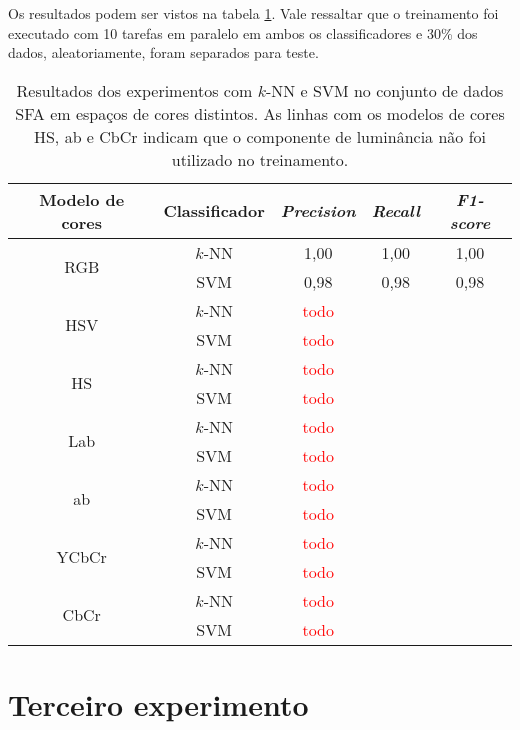 Os resultados podem ser vistos na tabela \ref{tab:resultados_experimento_dois}. Vale ressaltar que o treinamento foi executado com 10 tarefas em paralelo em ambos os classificadores e 30\% dos dados, aleatoriamente, foram separados para teste.
\begin{table}[!htpb]
\centering
\begin{small}
\setlength{\tabcolsep}{8pt}

\begin{tabular}{|c|c|c|c|c|}\hline
 Modelo de cores & Classificador & \emph{Precision} & \emph{Recall} & \emph{F1-score} \\ \hline
 \multirow{2}{*}{RGB}   & $k$-NN  & 1,00 & 1,00 & 1,00 \\ \cline{2-5}
                        & SVM     & 0,98 & 0,98 & 0,98 \\ \hline
 \multirow{2}{*}{HSV}   & $k$-NN  & \textcolor{red}{todo} && \\ \cline{2-5}
                        & SVM     & \textcolor{red}{todo} && \\ \hline
 \multirow{2}{*}{HS}    & $k$-NN  & \textcolor{red}{todo} && \\ \cline{2-5}
                        & SVM     & \textcolor{red}{todo} && \\ \hline
 \multirow{2}{*}{Lab}   & $k$-NN  & \textcolor{red}{todo} && \\ \cline{2-5}
                        & SVM     & \textcolor{red}{todo} && \\ \hline
 \multirow{2}{*}{ab}    & $k$-NN  & \textcolor{red}{todo} && \\ \cline{2-5}
                        & SVM     & \textcolor{red}{todo} && \\ \hline
 \multirow{2}{*}{YCbCr} & $k$-NN  & \textcolor{red}{todo} && \\ \cline{2-5}
                        & SVM     & \textcolor{red}{todo} && \\ \hline
 \multirow{2}{*}{CbCr}  & $k$-NN  & \textcolor{red}{todo} && \\ \cline{2-5}
                        & SVM     & \textcolor{red}{todo} && \\ \hline

\end{tabular}
\end{small}
\caption[Resultados dos experimentos com $k$-NN e SVM no conjunto de dados SFA em espaços de cores distintos]{Resultados dos experimentos com $k$-NN e SVM no conjunto de dados SFA em espaços de cores distintos. As linhas com os modelos de cores HS, ab e CbCr indicam que o componente de luminância não foi utilizado no treinamento.}
\label{tab:resultados_experimento_dois}
\end{table}


\section{Terceiro experimento}
\label{sec:experimento_tres}